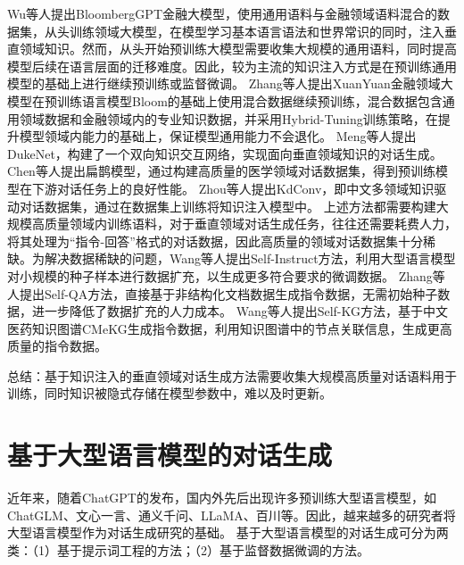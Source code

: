 Wu等人\cite{DBLP:journals/corr/abs-2303-17564}提出BloombergGPT金融大模型，使用通用语料与金融领域语料混合的数据集，从头训练领域大模型，在模型学习基本语言语法和世界常识的同时，注入垂直领域知识。然而，从头开始预训练大模型需要收集大规模的通用语料，同时提高模型后续在语言层面的迁移难度。因此，较为主流的知识注入方式是在预训练通用模型的基础上进行继续预训练或监督微调。
Zhang等人\cite{DBLP:conf/cikm/ZhangY23}提出XuanYuan金融领域大模型在预训练语言模型Bloom的基础上使用混合数据继续预训练，混合数据包含通用领域数据和金融领域内的专业知识数据，并采用Hybrid-Tuning训练策略，在提升模型领域内能力的基础上，保证模型通用能力不会退化。
Meng等人\cite{DBLP:conf/sigir/MengRCSRTR20}提出DukeNet，构建了一个双向知识交互网络，实现面向垂直领域知识的对话生成。
Chen等人\cite{DBLP:journals/corr/abs-2310-15896}提出扁鹊模型，通过构建高质量的医学领域对话数据集，得到预训练模型在下游对话任务上的良好性能。
Zhou等人\cite{DBLP:conf/acl/ZhouZHHZ20}提出KdConv，即中文多领域知识驱动对话数据集，通过在数据集上训练将知识注入模型中。
上述方法都需要构建大规模高质量领域内训练语料，对于垂直领域对话生成任务，往往还需要耗费人力，将其处理为“指令-回答”格式的对话数据，因此高质量的领域对话数据集十分稀缺。为解决数据稀缺的问题，Wang等人\cite{DBLP:conf/acl/WangKMLSKH23}提出Self-Instruct方法，利用大型语言模型对小规模的种子样本进行数据扩充，以生成更多符合要求的微调数据。
Zhang等人\cite{DBLP:journals/corr/abs-2305-11952}提出Self-QA方法，直接基于非结构化文档数据生成指令数据，无需初始种子数据，进一步降低了数据扩充的人力成本。
Wang等人\cite{DBLP:journals/corr/abs-2304-06975}提出Self-KG方法，基于中文医药知识图谱CMeKG生成指令数据，利用知识图谱中的节点关联信息，生成更高质量的指令数据。

总结：基于知识注入的垂直领域对话生成方法需要收集大规模高质量对话语料用于训练，同时知识被隐式存储在模型参数中，难以及时更新。

\section{基于大型语言模型的对话生成}

近年来，随着ChatGPT\cite{DBLP:conf/nips/Ouyang0JAWMZASR22}的发布，国内外先后出现许多预训练大型语言模型，如ChatGLM\cite{DBLP:conf/iclr/ZengLDWL0YXZXTM23}、文心一言\cite{DBLP:journals/corr/abs-2107-02137}、通义千问\cite{DBLP:journals/corr/abs-2309-16609}、LLaMA\cite{DBLP:journals/corr/abs-2302-13971}、百川\cite{DBLP:journals/corr/abs-2309-10305}等。因此，越来越多的研究者将大型语言模型作为对话生成研究的基础。
基于大型语言模型的对话生成可分为两类：（1）基于提示词工程的方法；（2）基于监督数据微调的方法。

